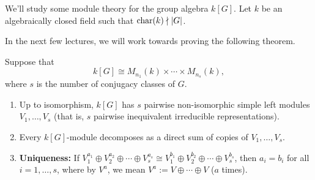 We'll study some module theory for the group algebra $k[G]$. Let 
$k$ be an algebraically closed field such that $\operatorname{char}(k) \nmid |G|$. 

In the next few lectures, we will work towards proving the following theorem. 

\begin{theo}{}
    Suppose that 
    \[ k[G] \cong M_{n_1}(k) \times \cdots \times M_{n_s}(k), \] 
    where $s$ is the number of conjugacy classes of $G$. 
    \begin{enumerate}[(1)]
        \item Up to isomorphism, $k[G]$ has $s$ pairwise non-isomorphic 
        simple left modules $V_1, \dots, V_s$ (that is, $s$ pairwise 
        inequivalent irreducible representations). 
        \item Every $k[G]$-module decomposes as a direct sum of copies of 
        $V_1, \dots, V_s$. 
        \item {\bf Uniqueness:} If $V_1^{a_1} \oplus V_2^{a_2} \oplus 
        \cdots \oplus V_s^{a_s} \cong V_1^{b_1} \oplus V_2^{b_2} \oplus 
        \cdots \oplus V_s^{b_s}$, then $a_i = b_i$ for all 
        $i = 1, \dots, s$, where by $V^a$, we mean $V^a := 
        V \oplus \cdots \oplus V$ ($a$ times).
    \end{enumerate}
\end{theo}

